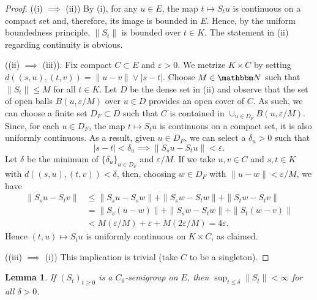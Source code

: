 \documentclass[12pt, reqno]{amsart}
\renewcommand{\leq}{\leqslant}
\renewcommand{\geq}{\geqslant}
\newcommand{\1}{\mathbbm 1}
\newcommand{\NN}{\mathbbm N}
\renewcommand{\epsilon}{\varepsilon}
\theoremstyle{plain}
\newtheorem{lemma}[theorem]{Lemma}
\theoremstyle{definition}
\begin{document}
\begin{proof}
    ((i) $\implies$ (ii)) By (i), for any $u \in E$, the map $t \mapsto S_t u$ is
    continuous on a compact set and, therefore, its image is bounded in $E$.  
    Hence, by the uniform boundedness principle, $\|S_t\|$ is bounded over $t
    \in K$.  The statement in (ii) regarding continuity is obvious.

    ((ii) $\implies$ (iii)).  Fix compact $C \subset E$ and $\epsilon > 0$.
    We metrize $K \times C$ by setting $d((s, u), (t, v)) = \| u - v\| \vee |s-t|$.
    Choose $M \in \NN$ such that $\|S_t\| \leq M$ for all $t \in K$.  Let $D$ be the
    dense set in (ii) and observe that the set of open balls $B(u, \epsilon/M)$
    over $u \in D$ provides an open cover of $C$.  As such, we can choose a finite
    set $D_F \subset D$ such that $C$ is contained in $\cup_{u \in D_F} B(u,
    \epsilon/M)$. Since, for each $u \in D_F$, the map
    $t \mapsto S_t u$ is continuous on a compact set, it is also uniformly
    continuous.  As a result, given $u \in D_F$, we can select a $\delta_u > 0$ such that
    \begin{equation*}
        |s - t| < \delta_u \implies \| S_s u - S_t u \| < \epsilon.
    \end{equation*}
    Let $\delta$ be the minimum of $\{\delta_u\}_{u \in D_F}$ and $\epsilon / M$.
    If we take $u, v \in C$ and $s, t \in K$ with $d((s, u), (t, v)) < \delta$, then,
    choosing $w \in D_F$ with $\|u - w \| < \epsilon / M$, we have
    \begin{align*}
        \| S_s u - S_t v \|
        & \leq \| S_s u - S_s w \| 
            + \| S_s w - S_t w \| 
                + \| S_t w - S_t v \|
                \\
        & = \| S_s (u - w) \| 
            + \| S_s w - S_t w \| 
                + \| S_t (w - v) \|
                \\
        & < M (\epsilon / M) + \epsilon + M (2 \epsilon / M) = 4 \epsilon.
    \end{align*}
    Hence $(t, u) \mapsto S_t u$ is
            uniformly continuous on $K \times C$, as claimed.

    ((iii) $\implies$ (i)) This implication is trivial (take $C$ to be a
    singleton).
\end{proof}

\begin{lemma}\label{l:ubfc}
    If $(S_t)_{t \geq 0}$ is a $C_0$-semigroup on $E$, then
        $\sup_{t \leq \delta} \| S_t \| < \infty$ for all $\delta > 0$.
\end{lemma}
\end{document}
